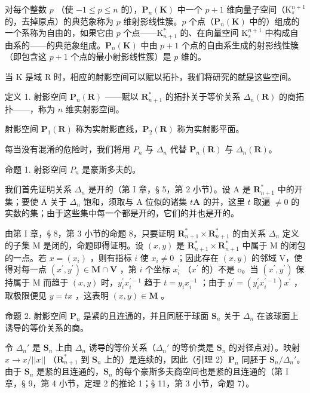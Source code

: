 对每个整数 \(p\) （使 \(-1 \leqslant p \leqslant n\) 的），\(\mathbf{P}_n(\mathbf{K})\) 中一个 \(p + 1\) 维向量子空间（\(\mathrm{K}_s^{n+1}\) 的，去掉原点）的典范象称为 \(p\) 维射影线性簇。\(p\) 个点（\(\mathbf{P}_n(\mathbf{K})\) 中的）组成的一个系称为自由的，如果它由 \(p\) 个点——\(\mathrm{K}_{n+1}^*\) 的、在向量空间 \(\mathrm{K}_s^{n+1}\) 中构成自由系的——的典范象组成。\(\mathbf{P}_n(\mathbf{K})\) 中由 \(p + 1\) 个点的自由系生成的射影线性簇（即包含这 \(p + 1\) 个点的最小射影线性簇）是 \(p\) 维的。

当 K 是域 R 时，相应的射影空间可以赋以拓扑，我们将研究的就是这些空间。

定义 1. 射影空间 \(\mathbf{P}_n(\mathbf{R})\) ——赋以 \(\mathbf{R}_{n+1}^*\) 的拓扑关于等价关系 \(\Delta_n(\mathbf{R})\) 的商拓扑——，称为 \(n\) 维实射影空间。

射影空间 \(\mathbf{P}_{1}(\mathbf{R})\) 称为实射影直线，\(\mathbf{P}_{2}(\mathbf{R})\) 称为实射影平面。

每当没有混淆的危险时，我们将用 \(P_{n}\) 与 \(\Delta_{n}\) 代替 \(\mathbf{P}_{n}(\mathbf{R})\) 与 \(\Delta_{n}(\mathbf{R})\)。

命题 1. 射影空间 \(P_{n}\) 是豪斯多夫的。

我们首先证明关系 \(\Delta_{n}\) 是开的（第 I 章，§ 5，第 2 小节）。设 A 是 \(\mathbf{R}_{n+1}^{*}\) 中的开集；要使 A 关于 \(\Delta_{n}\) 饱和，须取与 A 位似的诸集 \(t\mathbf{A}\) 的并，这里 \(t\) 取遍 \(\neq 0\) 的实数的集；由于这些集中每一个都是开的，它们的并也是开的。

由第 I 章，§ 8，第 3 小节的命题 8，只要证明 \(\mathbf{R}_{n+1}^{*}\times\mathbf{R}_{n+1}^{*}\) 的由关系 \(\Delta_{n}\) 定义的子集 M 是闭的，命题即得证明。设 \((x,y)\) 是 \(\mathbf{R}_{n+1}^{*}\times\mathbf{R}_{n+1}^{*}\) 中属于 M 的闭包的一点。若 \(x=(x_{i})\) ，则有指标 \(i\) 使 \(x_{i}\neq0\) ；因此存在 \((x,y)\) 的邻域 V，使得对每一点 \((x^{\prime},y^{\prime})\in\mathbf{M}\cap\mathbf{V}\) ，第 \(i\) 个坐标 \(x_{i}^{\prime}\) （\(x^{\prime}\) 的）不是 o。当 \((x^{\prime},y^{\prime})\) 保持属于 M 而趋于 \((x,y)\) 时，\(y_{i}^{\prime}x_{i}^{\prime-1}\) 趋于 \(t=y_{i}x_{i}^{-1}\) ；由于 \(y^{\prime}=(y_{i}^{\prime}x_{i}^{\prime-1})x^{\prime}\) ，取极限便见 \(y=tx\) ，这表明 \((x,y)\in\mathbf{M}\) 。

命题 2. 射影空间 \(\mathbf{P}_{n}\) 是紧的且连通的，并且同胚于球面 \(\mathbf{S}_{n}\) 关于 \(\Delta_{n}\) 在该球面上诱导的等价关系的商。

令 \(\Delta_n'\) 是 \(\mathbf{S}_n\) 上由 \(\Delta_n\) 诱导的等价关系（\(\Delta_n'\) 的等价类是 \(\mathbf{S}_n\) 的对径点对）。映射 \(x \to x/||x||\) （\(\mathbf{R}_{n+1}^*\) 到 \(\mathbf{S}_n\) 上的）是连续的，因此（引理 2）\(\mathbf{P}_n\) 同胚于 \(\mathbf{S}_n/\Delta_n'\)。由于 \(\mathbf{S}_n\) 是紧的且连通的，\(\mathbf{S}_n\) 的每个豪斯多夫商空间也是紧的且连通的（第 I 章，§ 9，第 4 小节，定理 2 的推论 1；§ 11，第 3 小节，命题 7）。

